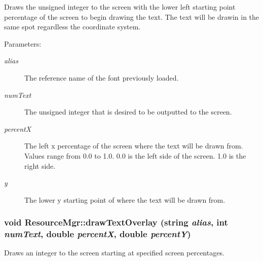 Draws the unsigned integer to the screen with the lower left starting point percentage of the screen to begin drawing the text. The text will be drawin in the same spot regardless the coordinate system. \begin{Desc}
\item[Parameters:]
\begin{description}
\item[{\em alias}]The reference name of the font previously loaded. \item[{\em numText}]The unsigned integer that is desired to be outputted to the screen. \item[{\em percentX}]The left x percentage of the screen where the text will be drawn from. Values range from 0.0 to 1.0. 0.0 is the left side of the screen. 1.0 is the right side. \item[{\em y}]The lower y starting point of where the text will be drawn from. \end{description}
\end{Desc}
\hypertarget{class_resource_mgr_45f157d11c70e86e4334b4378e1b8ac6}{
\subsubsection[{drawTextOverlay}]{\setlength{\rightskip}{0pt plus 5cm}void ResourceMgr::drawTextOverlay (string {\em alias}, \/  int {\em numText}, \/  double {\em percentX}, \/  double {\em percentY})}}
\label{class_resource_mgr_45f157d11c70e86e4334b4378e1b8ac6}


Draws an integer to the screen starting at specified screen percentages. 

